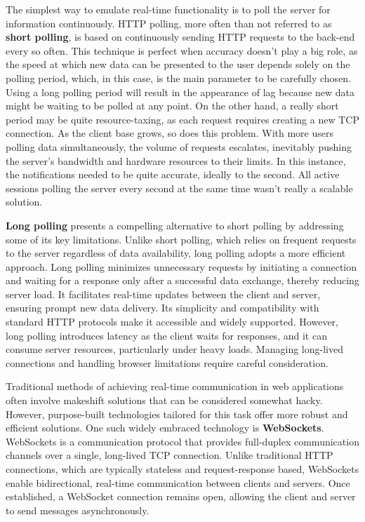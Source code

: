 \documentclass[FM,BP,EN,fonts]{tulthesis}
\begin{document}
The simplest way to emulate real-time functionality is to poll the server for information continuously. HTTP polling, more often than not referred to as \textbf{short polling}, is based on continuously sending HTTP requests to the back-end every so often. This technique is perfect when accuracy doesn't play a big role, as the speed at which new data can be presented to the user depends solely on the polling period, which, in this case, is the main parameter to be carefully chosen. Using a long polling period will result in the appearance of lag because new data might be waiting to be polled at any point. On the other hand, a really short period may be quite resource-taxing, as each request requires creating a new TCP connection. As the client base grows, so does this problem. With more users polling data simultaneously, the volume of requests escalates, inevitably pushing the server's bandwidth and hardware resources to their limits. In this instance, the notifications needed to be quite accurate, ideally to the second. All active sessions polling the server every second at the same time wasn't really a scalable solution.

\textbf{Long polling} presents a compelling alternative to short polling by addressing some of its key limitations. Unlike short polling, which relies on frequent requests to the server regardless of data availability, long polling adopts a more efficient approach. Long polling minimizes unnecessary requests by initiating a connection and waiting for a response only after a successful data exchange, thereby reducing server load. It facilitates real-time updates between the client and server, ensuring prompt new data delivery. Its simplicity and compatibility with standard HTTP protocols make it accessible and widely supported. However, long polling introduces latency as the client waits for responses, and it can consume server resources, particularly under heavy loads. Managing long-lived connections and handling browser limitations require careful consideration. 

Traditional methods of achieving real-time communication in web applications often involve makeshift solutions that can be considered somewhat hacky. However, purpose-built technologies tailored for this task offer more robust and efficient solutions. One such widely embraced technology is \textbf{WebSockets}. WebSockets is a communication protocol that provides full-duplex communication channels over a single, long-lived TCP connection. Unlike traditional HTTP connections, which are typically stateless and request-response based, WebSockets enable bidirectional, real-time communication between clients and servers. Once established, a WebSocket connection remains open, allowing the client and server to send messages asynchronously. 
\end{document}
